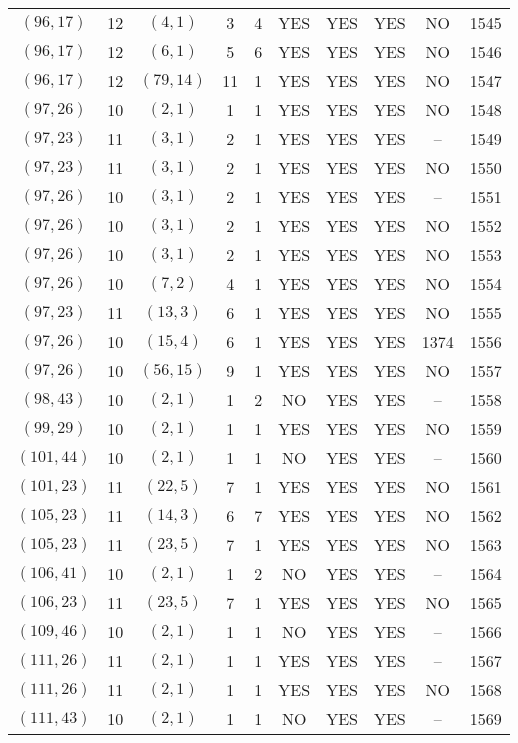 \begin{longtable}{|c|c|c|c|c|c|c|c|c|c|}
$(96, 17)$ & 12 & $(4, 1)$ & 3 & 4 & YES & YES & YES & NO & 1545\\
$(96, 17)$ & 12 & $(6, 1)$ & 5 & 6 & YES & YES & YES & NO & 1546\\
$(96, 17)$ & 12 & $(79, 14)$ & 11 & 1 & YES & YES & YES & NO & 1547\\
$(97, 26)$ & 10 & $(2, 1)$ & 1 & 1 & YES & YES & YES & NO & 1548\\
$(97, 23)$ & 11 & $(3, 1)$ & 2 & 1 & YES & YES & YES & -- & 1549\\
$(97, 23)$ & 11 & $(3, 1)$ & 2 & 1 & YES & YES & YES & NO & 1550\\
$(97, 26)$ & 10 & $(3, 1)$ & 2 & 1 & YES & YES & YES & -- & 1551\\
$(97, 26)$ & 10 & $(3, 1)$ & 2 & 1 & YES & YES & YES & NO & 1552\\
$(97, 26)$ & 10 & $(3, 1)$ & 2 & 1 & YES & YES & YES & NO & 1553\\
$(97, 26)$ & 10 & $(7, 2)$ & 4 & 1 & YES & YES & YES & NO & 1554\\
$(97, 23)$ & 11 & $(13, 3)$ & 6 & 1 & YES & YES & YES & NO & 1555\\
$(97, 26)$ & 10 & $(15, 4)$ & 6 & 1 & YES & YES & YES & 1374 & 1556\\
$(97, 26)$ & 10 & $(56, 15)$ & 9 & 1 & YES & YES & YES & NO & 1557\\
$(98, 43)$ & 10 & $(2, 1)$ & 1 & 2 & NO & YES & YES & -- & 1558\\
$(99, 29)$ & 10 & $(2, 1)$ & 1 & 1 & YES & YES & YES & NO & 1559\\
$(101, 44)$ & 10 & $(2, 1)$ & 1 & 1 & NO & YES & YES & -- & 1560\\
$(101, 23)$ & 11 & $(22, 5)$ & 7 & 1 & YES & YES & YES & NO & 1561\\
$(105, 23)$ & 11 & $(14, 3)$ & 6 & 7 & YES & YES & YES & NO & 1562\\
$(105, 23)$ & 11 & $(23, 5)$ & 7 & 1 & YES & YES & YES & NO & 1563\\
$(106, 41)$ & 10 & $(2, 1)$ & 1 & 2 & NO & YES & YES & -- & 1564\\
$(106, 23)$ & 11 & $(23, 5)$ & 7 & 1 & YES & YES & YES & NO & 1565\\
$(109, 46)$ & 10 & $(2, 1)$ & 1 & 1 & NO & YES & YES & -- & 1566\\
$(111, 26)$ & 11 & $(2, 1)$ & 1 & 1 & YES & YES & YES & -- & 1567\\
$(111, 26)$ & 11 & $(2, 1)$ & 1 & 1 & YES & YES & YES & NO & 1568\\
$(111, 43)$ & 10 & $(2, 1)$ & 1 & 1 & NO & YES & YES & -- & 1569\\

\end{longtable}
